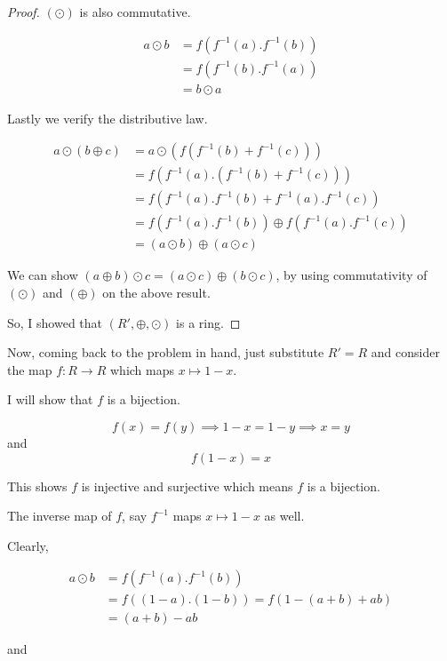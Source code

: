 \documentclass[12pt,a4paper]{article}
\theoremstyle{definition}
\begin{document}
\begin{flushleft}
\begin{proof}
	$(\odot)$ is also commutative.

	\begin{align*}
		a \odot b &= f(f^{-1}(a).f^{-1}(b)) \\
		&= f(f^{-1}(b).f^{-1}(a)) \\
		&= b \odot a
	\end{align*}

	Lastly we verify the distributive law.

	\begin{align*}
		a \odot (b \oplus c) &= a \odot (f(f^{-1}(b) + f^{-1}(c))) \\
		&= f(f^{-1}(a).(f^{-1}(b) + f^{-1}(c))) \\
		&= f(f^{-1}(a).f^{-1}(b) + f^{-1}(a).f^{-1}(c)) \\
		&= f(f^{-1}(a).f^{-1}(b)) \oplus f(f^{-1}(a).f^{-1}(c))\\
		&= (a \odot b) \oplus (a \odot c)
	\end{align*}

	We can show $(a \oplus b) \odot c = (a \odot c) \oplus (b\odot c) $, by using commutativity of $(\odot)$ and $(\oplus)$ on the above result.

	\medskip

	So, I showed that $(R',\oplus,\odot)$ is a ring.
				
\end{proof}

Now, coming back to the problem in hand, just substitute $R' = R$ and consider the map $f:R\to R$ which maps $x \mapsto 1 - x$.

\medskip

I will show that $f$ is a bijection.

$$f(x) = f(y) \implies 1-x = 1-y \implies x =y$$ and
$$f(1-x) = x$$

This shows $f$ is injective and surjective which means $f$ is a bijection.

\medskip

The inverse map of $f$, say $f^{-1}$ maps $x \mapsto 1-x$ as well.


\medskip

Clearly,

\begin{align*}
	a \odot b &= f(f^{-1}(a).f^{-1}(b)) \\
	&= f((1-a).(1-b)) = f(1-(a+b)+ab) \\
	&= (a+b) - ab
\end{align*}

and


\end{flushleft}
\end{document}
